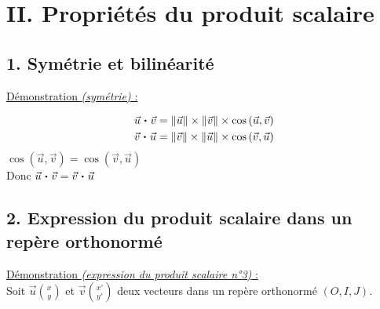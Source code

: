 \documentclass[11pt,a4paper]{article}
\newcommand{\pdt}{\mathbin{\vcenter{\hbox{\scalebox{0.6}{\textbullet}}}}}
\begin{document}
\newpage

\section*{II. Propriétés du produit scalaire}

\subsection*{1. Symétrie et bilinéarité}

\underline{Démonstration \emph{(symétrie)} :}

\begin{equation*}
    \begin{split}
        \vec{u}\pdt\vec{v}&=\|\vec{u}\|\times\|\vec{v}\|\times\cos{(\vec{u}, \vec{v})} \\
        \vec{v}\pdt\vec{u}&=\|\vec{v}\|\times\|\vec{u}\|\times\cos{(\vec{v}, \vec{u})}
    \end{split}
\end{equation*}
$\cos{(\vec{u}, \vec{v})}=\cos{(\vec{v}, \vec{u})}$ \\
Donc $\vec{u}\pdt\vec{v}=\vec{v}\pdt\vec{u}$
\subsection*{2. Expression du produit scalaire dans un repère orthonormé}

\underline{Démonstration \emph{(expression du produit scalaire n°3)} :}~\\

Soit $\displaystyle\vec{u}\binom{x}{y}$ et $\displaystyle\vec{v}\binom{x'}{y'}$ deux vecteurs dans un repère orthonormé $(O, I, J)$.
\end{document}
